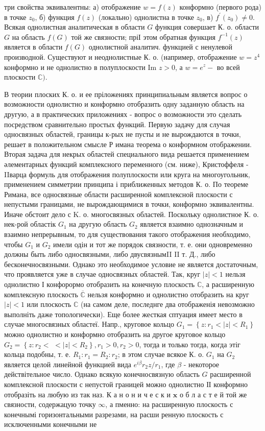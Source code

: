 \documentclass[10pt]{article}
\begin{document}
три свойства эквивалентны: а) отображение $w=f(z)$ конформно (первого рода) в точке $z_{0}$, б) функция $f(z)$ (локально) однолистна в точке $z_{0}$, в) $f^{\prime}\left(z_{0}\right) \neq 0$. Всякая однолистная аналитическая в области $G$ функция совершает К. о. области $G$ на область $f(G)$ той же связности; пріІ этом обратная функция $f^{-1}(z)$ является в области $f(G)$ однолистной аналитич. функцией с ненулевой производной. Существуют и неоднолистные К. о. (например, отображение $w=z^{4}$ конформно и не однолистно в полуплоскости Im $z>0$, а $w=e^{z}-$ во всей плоскости $\mathbb{C})$.



В теории плоских К. о. и ее пріложениях принципиальным является вопрос о возможности однолистно и конформно отобразить одну заданную область на другую, а в практических приложениях - вопрос о возможности это сделать посредством сравнительно простых функций. Первую задачу для случая односвязных областей, границы к-рых не пусты и не вырождаются в точки, решает в положительном смысле Р имана теорема о конформном отображении. Вторая задача для некрых областей специального вида решается применением әлементарных функций комплексного переменного (см. ниже), Кристоффеля - IIварца формуль для отображения полуплоскости или круга на многоугольник, применением симметрии принципа і приближенных методов К. о. По теореме Римана, все односвязные области расширенной комплексной плоскости с непустыми границами, не вырождающимися в точки, конформно эквивалентны. Иначе обстоит дело с K. о. многосвязных областей. Поскольку однолистное К. о. нек-рой областік $G_{1}$ на другую область $G_{2}$ является взаимно однозначным и взаимно непрерывным, то для существования такого отображения необходимо, чтобы $G_{1}$ и $G_{2}$ имели одін и тот же порядок связности, т. е. они одновременно должны быть либо односвязными, либо двусвязнымII II т. Д., либо бесконечносвязными. Однако это необходимое условие не является достаточным, что проявляется уже в случае односвязных областей. Так, круг $|z|<1$ нельзя однолистно І конфорормо отобразить на конечную плоскость $\mathbb{C}$, а расширенную комплексную плоскость $\overline{\mathbb{C}}$ нельзя конформно и однолистно отобразить на круг $|z|<1$ или плоскость $\mathbb{C}$ (на самом деле, последнге два отображенія невозможно выполніть даже топологически). Еще более жесткая сптуация имеет место в случае многосвязных областеї. Напр., круговое кольцо $G_{1}=\left\{z: r_{1}<|z|<R_{1}\right\}$ можно однолистно и конформно отобразить на другое круговое кольцо $G_{2}=\left\{z: r_{2}<\right.$ $\left.<|z|<R_{2}\right\}, r_{1}>0, r_{2}>0$, тогда и только тогда, когда этіг кольца подобны, т. е. $R_{1}: r_{1}=R_{2}: r_{2}$; в этом случае всякое К. о. $G_{1}$ на $G_{2}$ является целой линейной функцией вида $e^{i \beta} r_{2} z / r_{1}$, где $\beta$ - некоторое действітельное число. Однако всякую конечносвязную область $G$ расширенной комплексной плоскости с непустой границей можно однолистно ІІ конформно отобразіть на любую из так наз. К а н о н и ч е с к и $\mathbf{x}$ о б л а с т е й той же связности, содержацую точку $\infty$, а пменно: на расширенную плоскость с конечнымі горизонтальными разрезами, на расши ренную плоскость с исключенными конечными не 
\end{document}
